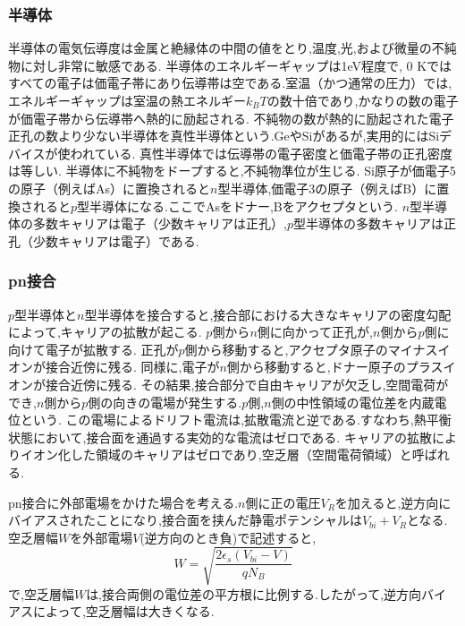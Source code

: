 \subsubsection{半導体}
半導体の電気伝導度は金属と絶縁体の中間の値をとり,温度,光,および微量の不純物に対し非常に敏感である.
半導体のエネルギーギャップは1eV程度で, 0 Kではすべての電子は価電子帯にあり伝導帯は空である.室温（かつ通常の圧力）では,エネルギーギャップは室温の熱エネルギー$k_BT$の数十倍であり,かなりの数の電子が価電子帯から伝導帯へ熱的に励起される.
不純物の数が熱的に励起された電子正孔の数より少ない半導体を真性半導体という.GeやSiがあるが,実用的にはSiデバイスが使われている.
真性半導体では伝導帯の電子密度と価電子帯の正孔密度は等しい.
半導体に不純物をドープすると,不純物準位が生じる.
Si原子が価電子5の原子（例えばAs）に置換されると$n$型半導体,価電子3の原子（例えばB）に置換されると$p$型半導体になる.ここでAsをドナー,Bをアクセプタという.
$n$型半導体の多数キャリアは電子（少数キャリアは正孔）,$p$型半導体の多数キャリアは正孔（少数キャリアは電子）である.

\subsubsection{pn接合}
$p$型半導体と$n$型半導体を接合すると,接合部における大きなキャリアの密度勾配によって,キャリアの拡散が起こる.
$p$側から$n$側に向かって正孔が,$n$側から$p$側に向けて電子が拡散する.
正孔が$p$側から移動すると,アクセプタ原子のマイナスイオンが接合近傍に残る.
同様に,電子が$n$側から移動すると,ドナー原子のプラスイオンが接合近傍に残る.
その結果,接合部分で自由キャリアが欠乏し,空間電荷ができ,$n$側から$p$側の向きの電場が発生する.$p$側,$n$側の中性領域の電位差を内蔵電位という.
この電場によるドリフト電流は,拡散電流と逆である.すなわち,熱平衡状態において,接合面を通過する実効的な電流はゼロである.
キャリアの拡散によりイオン化した領域のキャリアはゼロであり,空乏層（空間電荷領域）と呼ばれる.

pn接合に外部電場をかけた場合を考える.$n$側に正の電圧$V_R$を加えると,逆方向にバイアスされたことになり,接合面を挟んだ静電ポテンシャルは$V_{bi}+V_R$となる.
空乏層幅$W$を外部電場$V$(逆方向のとき負)で記述すると,
\begin{equation}
W=\sqrt{\frac{2\epsilon_s(V_{bi}-V)}{qN_B}}
\end{equation}
で,空乏層幅$W$は,接合両側の電位差の平方根に比例する.したがって,逆方向バイアスによって,空乏層幅は大きくなる.

